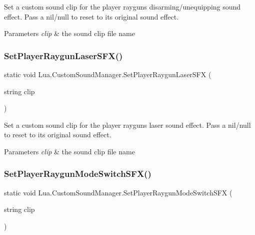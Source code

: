 Set a custom sound clip for the player raygun\textquotesingle{}s disarming/unequipping sound effect. Pass a nil/null to reset to its original sound effect. 


\begin{DoxyParams}{Parameters}
{\em clip} & the sound clip file name\\
\hline
\end{DoxyParams}
\mbox{\label{class_lua_1_1_custom_sound_manager_a3d7a983d62142d44f24d0e3dea537a65}} 
\subsubsection{\texorpdfstring{SetPlayerRaygunLaserSFX()}{SetPlayerRaygunLaserSFX()}}
{\footnotesize\ttfamily static void Lua.\+Custom\+Sound\+Manager.\+Set\+Player\+Raygun\+Laser\+S\+FX (\begin{DoxyParamCaption}\item[{string}]{clip }\end{DoxyParamCaption})\hspace{0.3cm}{\ttfamily [static]}}



Set a custom sound clip for the player raygun\textquotesingle{}s laser sound effect. Pass a nil/null to reset to its original sound effect. 


\begin{DoxyParams}{Parameters}
{\em clip} & the sound clip file name\\
\hline
\end{DoxyParams}
\mbox{\label{class_lua_1_1_custom_sound_manager_a6ad73ad3423d997434d87a1829f9d910}} 
\subsubsection{\texorpdfstring{SetPlayerRaygunModeSwitchSFX()}{SetPlayerRaygunModeSwitchSFX()}}
{\footnotesize\ttfamily static void Lua.\+Custom\+Sound\+Manager.\+Set\+Player\+Raygun\+Mode\+Switch\+S\+FX (\begin{DoxyParamCaption}\item[{string}]{clip }\end{DoxyParamCaption})\hspace{0.3cm}{\ttfamily [static]}}



